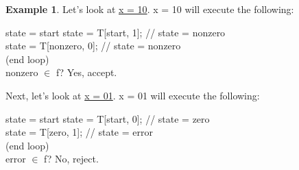 \documentclass[]{article}
\theoremstyle{definition}
\newtheorem{ex}{Example}[section]
\begin{document}
\begin{ex}
				Let's look at \underline{x = 10}. x = 10 will execute the following: \\
				\begin{algorithm}[H]
					state = start\;
					state = T[start, 1]; // state = nonzero \\
					state = T[nonzero, 0]; // state = nonzero \\
					(end loop) \\
					nonzero $\in $ f? Yes, accept.
				\end{algorithm}
				\vspace{0.5cm}
				Next, let's look at \underline{x = 01}. x = 01 will execute the following: \\
				\begin{algorithm}[H]
					state = start\;
					state = T[start, 0]; // state = zero \\
					state = T[zero, 1]; // state = error \\
					(end loop) \\
					error $\in $ f? No, reject.
				\end{algorithm}
			\end{ex}
\end{document}
